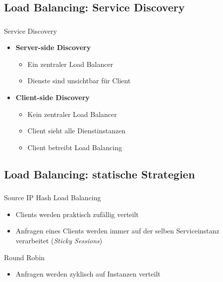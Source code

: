 \subsection{Load Balancing: Service Discovery}
\begin{frame}
	\frametitle{\insertsection}
    \framesubtitle{\insertsubsection}
    \begin{block}{Service Discovery}
	\begin{itemize}
		\item \textbf{Server-side Discovery}
		\begin{itemize}
			\item Ein zentraler Load Balancer
			\item Dienste sind unsichtbar für Client
		\end{itemize}
			\item \textbf{Client-side Discovery}
		\begin{itemize}
			\item Kein zentraler Load Balancer
			\item Client sieht alle Dienstinstanzen
			\item Client betreibt Load Balancing
		\end{itemize}
	\end{itemize}
    \end{block}
\end{frame}


\subsection{Load Balancing: statische Strategien}
\begin{frame}
    \frametitle{\insertsection}
    \framesubtitle{\insertsubsection}
    \begin{block}{Source IP Hash Load Balancing}
        \begin{itemize}
            \item Clients werden praktisch zufällig verteilt
            \item Anfragen eines Clients werden immer auf der selben Serviceinstanz verarbeitet (\textit{Sticky Sessions})
        \end{itemize}
    \end{block}
    \begin{block}{Round Robin}
        \begin{itemize}
            \item Anfragen werden zyklisch auf Instanzen verteilt
        \end{itemize}
    \end{block}
\end{frame}

